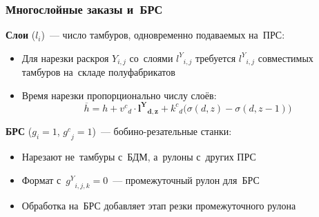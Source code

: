 \begin{frame}
    \frametitle{Многослойные заказы и~БРС}
    \textbf{Слои} ($l_i$)~--- число тамбуров, одновременно подаваемых на~ПРС:
    \begin{itemize}
        \item Для нарезки раскроя $Y_{i,j}$ со~слоями ${l^Y}_{i,j}$ требуется ${l^Y}_{i,j}$ совместимых тамбуров на~складе полуфабрикатов
        \item Время нарезки пропорционально числу слоёв:
        \[
        \overline{h}= h+{v^c}_d\cdot\mathbf{{l^Y}_{d,z}}+{k^c}_d\bigl(\sigma(d,z)-\sigma(d,z{-}1)\bigr)
        \]
    \end{itemize}

    \vspace{0.3cm}
    \textbf{БРС} ($g_i{=}1$, ${g^c}_j{=}1$)~--- бобино-резательные станки:
    \begin{itemize}
        \item Нарезают не~тамбуры с~БДМ, а~рулоны с~других ПРС
        \item Формат с~${g^Y}_{i,j,k}{=}0$~--- промежуточный рулон для~БРС
        \item Обработка на~БРС добавляет этап резки промежуточного рулона
    \end{itemize}
\end{frame}
